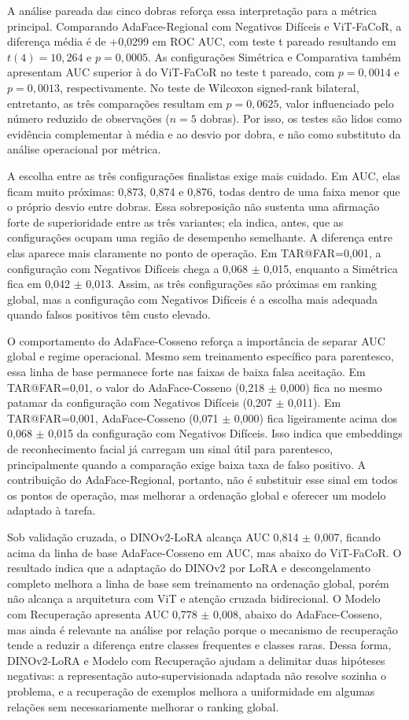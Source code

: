 A análise pareada das cinco dobras reforça essa interpretação para a métrica principal. Comparando AdaFace-Regional com Negativos Difíceis e ViT-FaCoR, a diferença média é de +0,0299 em ROC AUC, com teste t pareado resultando em $t(4)=10{,}264$ e $p=0{,}0005$. As configurações Simétrica e Comparativa também apresentam AUC superior à do ViT-FaCoR no teste t pareado, com $p=0{,}0014$ e $p=0{,}0013$, respectivamente. No teste de Wilcoxon signed-rank bilateral, entretanto, as três comparações resultam em $p=0{,}0625$, valor influenciado pelo número reduzido de observações ($n=5$ dobras). Por isso, os testes são lidos como evidência complementar à média e ao desvio por dobra, e não como substituto da análise operacional por métrica.

A escolha entre as três configurações finalistas exige mais cuidado. Em AUC, elas ficam muito próximas: 0,873, 0,874 e 0,876, todas dentro de uma faixa menor que o próprio desvio entre dobras. Essa sobreposição não sustenta uma afirmação forte de superioridade entre as três variantes; ela indica, antes, que as configurações ocupam uma região de desempenho semelhante. A diferença entre elas aparece mais claramente no ponto de operação. Em TAR@FAR=0,001, a configuração com Negativos Difíceis chega a 0,068 $\pm$ 0,015, enquanto a Simétrica fica em 0,042 $\pm$ 0,013. Assim, as três configurações são próximas em ranking global, mas a configuração com Negativos Difíceis é a escolha mais adequada quando falsos positivos têm custo elevado.

O comportamento do AdaFace-Cosseno reforça a importância de separar AUC global e regime operacional. Mesmo sem treinamento específico para parentesco, essa linha de base permanece forte nas faixas de baixa falsa aceitação. Em TAR@FAR=0,01, o valor do AdaFace-Cosseno (0,218 $\pm$ 0,000) fica no mesmo patamar da configuração com Negativos Difíceis (0,207 $\pm$ 0,011). Em TAR@FAR=0,001, AdaFace-Cosseno (0,071 $\pm$ 0,000) fica ligeiramente acima dos 0,068 $\pm$ 0,015 da configuração com Negativos Difíceis. Isso indica que embeddings de reconhecimento facial já carregam um sinal útil para parentesco, principalmente quando a comparação exige baixa taxa de falso positivo. A contribuição do AdaFace-Regional, portanto, não é substituir esse sinal em todos os pontos de operação, mas melhorar a ordenação global e oferecer um modelo adaptado à tarefa.

Sob validação cruzada, o DINOv2-LoRA alcança AUC 0,814 $\pm$ 0,007, ficando acima da linha de base AdaFace-Cosseno em AUC, mas abaixo do ViT-FaCoR. O resultado indica que a adaptação do DINOv2 por LoRA e descongelamento completo melhora a linha de base sem treinamento na ordenação global, porém não alcança a arquitetura com ViT e atenção cruzada bidirecional. O Modelo com Recuperação apresenta AUC 0,778 $\pm$ 0,008, abaixo do AdaFace-Cosseno, mas ainda é relevante na análise por relação porque o mecanismo de recuperação tende a reduzir a diferença entre classes frequentes e classes raras. Dessa forma, DINOv2-LoRA e Modelo com Recuperação ajudam a delimitar duas hipóteses negativas: a representação auto-supervisionada adaptada não resolve sozinha o problema, e a recuperação de exemplos melhora a uniformidade em algumas relações sem necessariamente melhorar o ranking global.

